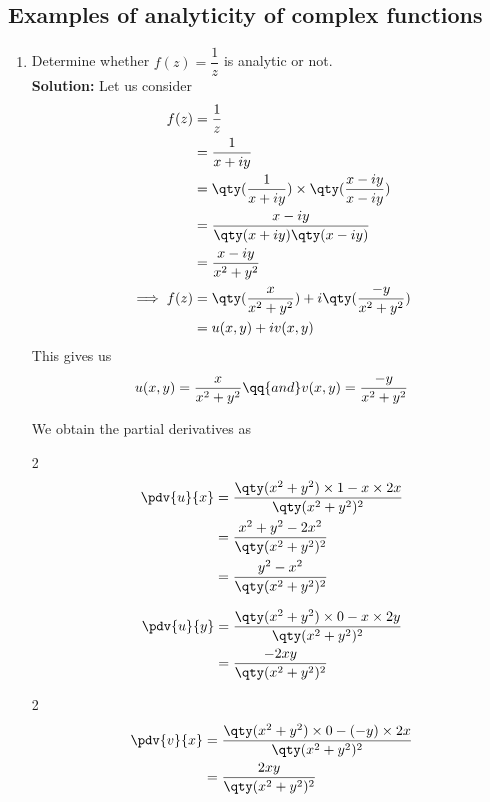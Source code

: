 	\subsection{Examples of analyticity of complex functions}
		\begin{enumerate}
			\item Determine whether $f(z)=\dfrac{1}{z}$ is analytic or not.\\
			\textbf{Solution:} Let us consider
			\begin{align*}
				f(z)&=\dfrac{1}{z} \\
					&=\dfrac{1}{x+iy} \\
					&=\qty(\dfrac{1}{x+iy})\times\qty(\dfrac{x-iy}{x-iy}) \\
					&=\dfrac{x-iy}{\qty(x+iy)\qty(x-iy)} \\
					&=\dfrac{x-iy}{x^2+y^2} \\
				\implies f(z)&=\qty(\dfrac{x}{x^2+y^2})+i\qty(\dfrac{-y}{x^2+y^2}) \\
					&=u(x,y)+iv(x,y)
			\end{align*}
			This gives us
			\begin{align*}
				u(x,y)=\dfrac{x}{x^2+y^2}\qq{and}v(x,y)=\dfrac{-y}{x^2+y^2}
			\end{align*}
			
			We obtain the partial derivatives as\vspace{-3ex}
			\begin{multicols}{2}
				\begin{align*}
					\pdv{u}{x}&=\dfrac{\qty(x^2+y^2)\times 1-x\times 2x}{\qty(x^2+y^2)^2} \\
					&=\dfrac{x^2+y^2-2x^2}{\qty(x^2+y^2)^2} \\
					&=\dfrac{y^2-x^2}{\qty(x^2+y^2)^2}
				\end{align*}
				
				\begin{align*}
					\pdv{u}{y}&=\dfrac{\qty(x^2+y^2)\times 0-x\times 2y}{\qty(x^2+y^2)^2} \\
					&=\dfrac{-2xy}{\qty(x^2+y^2)^2}
				\end{align*}
			\end{multicols}
			\vspace{-3ex}
			
			\begin{multicols}{2}
				\begin{align*}
					\pdv{v}{x}&=\dfrac{\qty(x^2+y^2)\times 0-(-y)\times 2x}{\qty(x^2+y^2)^2} \\
					&=\dfrac{2xy}{\qty(x^2+y^2)^2}
				\end{align*}
				

\end{multicols}
\end{enumerate}
